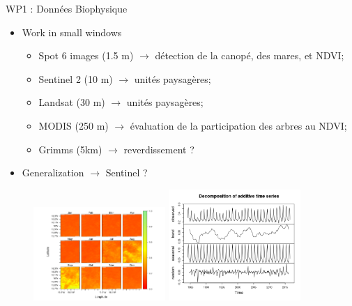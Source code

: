\documentclass[newPxFont]{beamer}
\begin{document}
\begin{frame}[c]{WP1 : Données Biophysique}
\vspace{-2em}
\begin{itemize}
  \item Work in small windows
  \begin{itemize}
    \item Spot 6 images (1.5 m) $\rightarrow$ détection de la canopé, des mares, et NDVI;
    \item Sentinel 2 (10 m) $\rightarrow$ unités paysagères;
    \item Landsat (30 m) $\rightarrow$ unités paysagères;
    \item MODIS (250 m) $\rightarrow$ évaluation de la participation des arbres au NDVI;
    \item Grimms (5km) $\rightarrow$ reverdissement ?
  \end{itemize}
  \item Generalization $\rightarrow$ Sentinel ?
\end{itemize}
\vspace{-1em}
\begin{figure}
	\centering
	\includegraphics[width = 5cm]{img/NDVI2015}
  \includegraphics[width = 5cm]{img/reverdiement}
\end{figure}
\end{frame}
\end{document}
